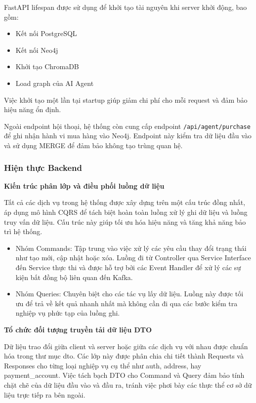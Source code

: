FastAPI lifespan được sử dụng để khởi tạo tài nguyên khi server khởi động, bao gồm:

\begin{itemize}
\item Kết nối PostgreSQL
\item Kết nối Neo4j
\item Khởi tạo ChromaDB
\item Load graph của AI Agent
\end{itemize}

Việc khởi tạo một lần tại startup giúp giảm chi phí cho mỗi request và đảm bảo hiệu năng ổn định.

Ngoài endpoint hội thoại, hệ thống còn cung cấp endpoint \texttt{/api/agent/purchase} để ghi nhận hành vi mua hàng vào Neo4j. Endpoint này kiểm tra dữ liệu đầu vào và sử dụng MERGE để đảm bảo không tạo trùng quan hệ.

\subsubsection{Hiện thực Backend}

\textbf{Kiến trúc phân lớp và điều phối luồng dữ liệu}

Tất cả các dịch vụ trong hệ thống được xây dựng trên một cấu trúc đồng nhất, áp dụng mô hình CQRS để tách biệt hoàn toàn luồng xử lý ghi dữ liệu và luồng truy vấn dữ liệu. Cấu trúc này giúp tối ưu hóa hiệu năng và tăng khả năng bảo trì hệ thống.

\begin{itemize}
    \item Nhóm Commands: Tập trung vào việc xử lý các yêu cầu thay đổi trạng thái như tạo mới, cập nhật hoặc xóa. Luồng đi từ Controller qua Service Interface đến Service thực thi và được hỗ trợ bởi các Event Handler để xử lý các sự kiện bất đồng bộ liên quan đến Kafka.
    \item Nhóm Queries: Chuyên biệt cho các tác vụ lấy dữ liệu. Luồng này được tối ưu để trả về kết quả nhanh nhất mà không cần đi qua các bước kiểm tra nghiệp vụ phức tạp của luồng ghi.
\end{itemize}

\textbf{Tổ chức đối tượng truyền tải dữ liệu DTO}

Dữ liệu trao đổi giữa client và server hoặc giữa các dịch vụ với nhau được chuẩn hóa trong thư mục dto. Các lớp này được phân chia chi tiết thành Requests và Responses cho từng loại nghiệp vụ cụ thể như auth, address, hay payment\_account. Việc tách bạch DTO cho Command và Query đảm bảo tính chặt chẽ của dữ liệu đầu vào và đầu ra, tránh việc phơi bày các thực thể cơ sở dữ liệu trực tiếp ra bên ngoài.

